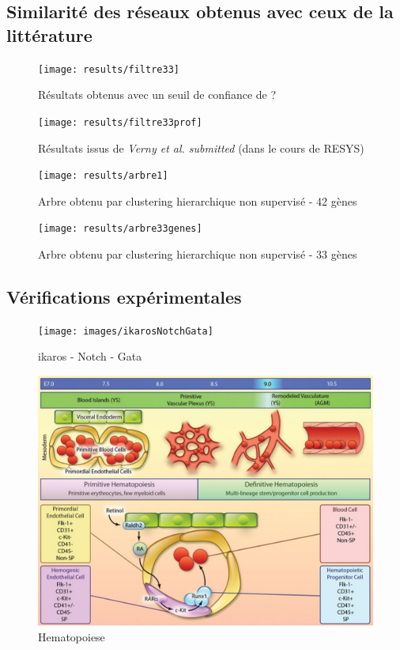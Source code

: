 \documentclass[fleqn,11pt]{SelfArx} %
\begin{document}
\subsection{Similarité des réseaux obtenus avec ceux de la littérature}
\begin{figure}[ht]
\centering
\texttt{[image: results/filtre33]}
\caption{Résultats obtenus avec un seuil de confiance de ? }
\label{fig:filtre33}
\end{figure}

\begin{figure}[ht]
\centering
\texttt{[image: results/filtre33prof]}
\caption{Résultats issus de \textit{Verny et al. submitted} (dans le cours de RESYS)}
\label{fig:filtre33}
\end{figure}


\begin{figure}[ht]
\centering
\texttt{[image: results/arbre1]}
\caption{Arbre obtenu par clustering hierarchique non supervisé - 42 gènes}
\label{fig:arbre1}
\end{figure}

\begin{figure}[ht]
\centering
\texttt{[image: results/arbre33genes]}
\caption{Arbre obtenu par clustering hierarchique non supervisé - 33 gènes}
\label{fig:arbre33}
\end{figure}


\subsection{Vérifications expérimentales}

\begin{figure}[ht]
\centering
\texttt{[image: images/ikarosNotchGata]}
\caption{ikaros - Notch - Gata}
\label{fig:ikarosNotchGata}
\end{figure}


\begin{figure}[ht]
\centering
\includegraphics[width=\linewidth]{images/synthese}
\caption{Hematopoiese}
\label{fig:synthese}
\end{figure}
\end{document}
